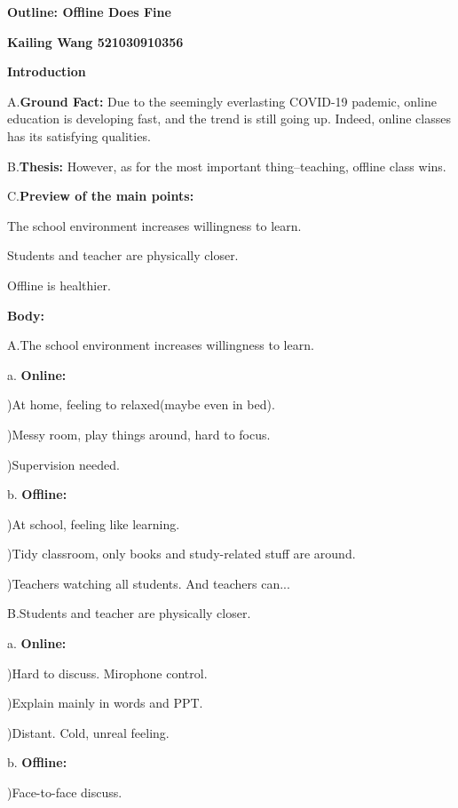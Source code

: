 \documentclass{article}
\begin{document}
{

\Large
\noindent\textbf{Outline: Offline Does Fine}

\noindent\small\textbf{Kailing Wang 521030910356}
\\
	\large

	\noindent\textbf{Introduction}

		A.\qquad \textbf {Ground Fact:} Due to the seemingly everlasting COVID-19 pademic, online education is developing fast, and the trend is still going up. Indeed, online classes has its satisfying qualities.

		B.\qquad \textbf {Thesis:} However, as for the most important thing--teaching, offline class wins.

		C.\qquad \textbf {Preview of the main points:}

				\qquad\qquad The school environment increases willingness to learn.

				\qquad\qquad Students and teacher are physically closer.

				\qquad\qquad Offline is healthier.

	\noindent\textbf{Body:}

		A.\qquad The school environment increases willingness to learn.

			\qquad a. \textbf {Online:}

				\qquad{})At home, feeling to relaxed(maybe even in bed).

				\qquad{})Messy room, play things around, hard to focus.

				\qquad{})Supervision needed.

			\qquad b. \textbf {Offline:}

				\qquad{})At school, feeling like learning.

				\qquad{})Tidy classroom, only books and study-related stuff are around.

				\qquad{})Teachers watching all students. And teachers can...

		B.\qquad Students and teacher are physically closer.

			\qquad a. \textbf {Online:}

				\qquad{})Hard to discuss. Mirophone control.

				\qquad{})Explain mainly in words and PPT.

				\qquad{})Distant. Cold, unreal feeling.

			\qquad b. \textbf {Offline:}

				\qquad{})Face-to-face discuss.

}
\end{document}
